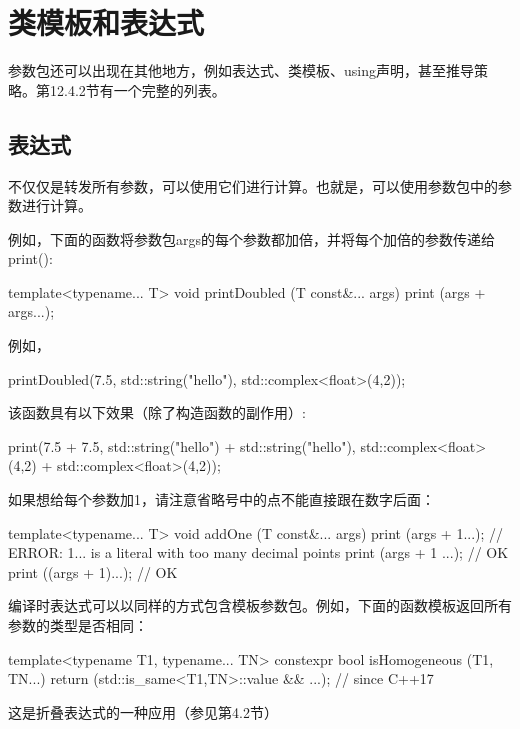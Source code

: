 \section{类模板和表达式}

参数包还可以出现在其他地方，例如表达式、类模板、using声明，甚至推导策略。第12.4.2节有一个完整的列表。

\subsection{表达式}

不仅仅是转发所有参数，可以使用它们进行计算。也就是，可以使用参数包中的参数进行计算。

例如，下面的函数将参数包args的每个参数都加倍，并将每个加倍的参数传递给print():

\begin{cpp}
template<typename... T>
void printDoubled (T const&... args)
{
	print (args + args...);
}
\end{cpp}

例如，

\begin{cpp}
printDoubled(7.5, std::string("hello"), std::complex<float>(4,2));
\end{cpp}

该函数具有以下效果（除了构造函数的副作用）:

\begin{cpp}
print(7.5 + 7.5,
	std::string("hello") + std::string("hello"),
	std::complex<float>(4,2) + std::complex<float>(4,2));
\end{cpp}

如果想给每个参数加1，请注意省略号中的点不能直接跟在数字后面：

\begin{cpp}
template<typename... T>
void addOne (T const&... args)
{
	print (args + 1...); // ERROR: 1... is a literal with too many decimal points
	print (args + 1 ...); // OK
	print ((args + 1)...); // OK
}
\end{cpp}

编译时表达式可以以同样的方式包含模板参数包。例如，下面的函数模板返回所有参数的类型是否相同：

\begin{cpp}
template<typename T1, typename... TN>
constexpr bool isHomogeneous (T1, TN...)
{
	return (std::is_same<T1,TN>::value && ...); // since C++17
}
\end{cpp}

这是折叠表达式的一种应用（参见第4.2节）

